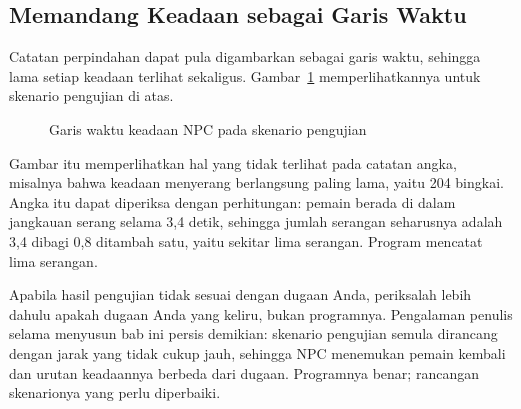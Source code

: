\subsection{Memandang Keadaan sebagai Garis Waktu}

Catatan perpindahan dapat pula digambarkan sebagai garis waktu, sehingga lama
setiap keadaan terlihat sekaligus. Gambar~\ref{fig:garis-waktu-keadaan}
memperlihatkannya untuk skenario pengujian di atas.

\begin{figure}[htbp]
\centering

\caption{Garis waktu keadaan NPC pada skenario pengujian}
\label{fig:garis-waktu-keadaan}
\end{figure}

Gambar itu memperlihatkan hal yang tidak terlihat pada catatan angka, misalnya
bahwa keadaan menyerang berlangsung paling lama, yaitu 204 bingkai. Angka itu
dapat diperiksa dengan perhitungan: pemain berada di dalam jangkauan serang
selama 3,4 detik, sehingga jumlah serangan seharusnya adalah 3,4 dibagi 0,8
ditambah satu, yaitu sekitar lima serangan. Program mencatat lima serangan.

\begin{catatabox}
Apabila hasil pengujian tidak sesuai dengan dugaan Anda, periksalah lebih
dahulu apakah dugaan Anda yang keliru, bukan programnya. Pengalaman penulis
selama menyusun bab ini persis demikian: skenario pengujian semula dirancang
dengan jarak yang tidak cukup jauh, sehingga NPC menemukan pemain kembali dan
urutan keadaannya berbeda dari dugaan. Programnya benar; rancangan
skenarionya yang perlu diperbaiki.
\end{catatabox}
